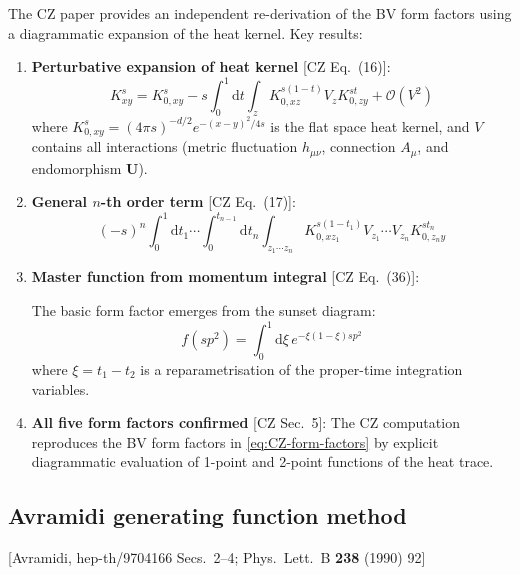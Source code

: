 \documentclass[12pt,a4paper]{article}
\theoremstyle{definition}
\theoremstyle{remark}
\newcommand{\dd}{\mathrm{d}}
\newcommand{\fromlit}[1]{\textcolor{blue!70!black}{\textsf{[#1]}}}
\begin{document}
The CZ paper provides an independent re-derivation of the BV form
factors using a diagrammatic expansion of the heat kernel.  Key results:

\begin{enumerate}
\item \textbf{Perturbative expansion of heat kernel}
\fromlit{CZ Eq.~(16)}:
\begin{equation}
  K_{xy}^s = K_{0,xy}^s
  - s\int_0^1\dd t\int_z K_{0,xz}^{s(1-t)}V_z K_{0,zy}^{st}
  + \mathcal{O}(V^2)
  \label{eq:CZ-perturbative}
\end{equation}
where $K_{0,xy}^s = (4\pi s)^{-d/2}e^{-(x-y)^2/4s}$ is the flat
space heat kernel, and $V$ contains all interactions
(metric fluctuation $h_{\mu\nu}$, connection $A_\mu$, and
endomorphism $\mathbf{U}$).

\item \textbf{General $n$-th order term} \fromlit{CZ Eq.~(17)}:
\begin{equation}
  (-s)^n \int_0^1\dd t_1\cdots\int_0^{t_{n-1}}\dd t_n
  \int_{z_1\cdots z_n}
  K_{0,xz_1}^{s(1-t_1)}V_{z_1}\cdots V_{z_n}K_{0,z_ny}^{st_n}
  \label{eq:CZ-nth-order}
\end{equation}

\item \textbf{Master function from momentum integral}
\fromlit{CZ Eq.~(36)}:

The basic form factor emerges from the sunset diagram:
\begin{equation}
  f(sp^2) = \int_0^1\dd\xi\,e^{-\xi(1-\xi)sp^2}
  \label{eq:CZ-master-from-diagram}
\end{equation}
where $\xi = t_1 - t_2$ is a reparametrisation of the proper-time
integration variables.

\item \textbf{All five form factors confirmed} \fromlit{CZ Sec.~5}:
The CZ computation reproduces the BV form factors in
\eqref{eq:CZ-form-factors} by explicit diagrammatic evaluation
of 1-point and 2-point functions of the heat trace.
\end{enumerate}


\subsection{Avramidi generating function method}

\fromlit{Avramidi, hep-th/9704166 Secs.~2--4;
         Phys.\ Lett.\ B \textbf{238} (1990) 92}
\end{document}
